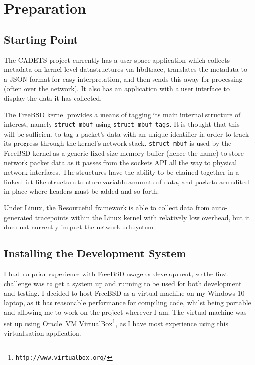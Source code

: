 \documentclass[a4paper,12pt,twoside,openright]{report}
\begin{document}
	
	
	\chapter{Preparation}
	
	\section{Starting Point}
	\label{sec:starting-point}
	
	The CADETS project currently has a user-space application which collects metadata on kernel-level	datastructures via libdtrace, translates the metadata to a JSON format for easy interpretation, and	then sends this away for processing (often over the network). It also has an application with a user interface to display the data it has collected.
	
	The FreeBSD kernel provides a means of tagging its main internal structure of interest, namely \verb|struct mbuf| using \verb|struct mbuf_tags|. It is thought that this will be sufficient to tag a packet’s data with an unique identifier in order to track its progress through the kernel’s network stack. \verb|struct mbuf| is used by the FreeBSD kernel as a generic fixed size memory buffer (hence the name) to store network packet data as it passes from the sockets API all the way to physical network interfaces. The structures have the ability to be chained together in a linked-list like structure to store variable amounts of data, and packets are edited in place where headers must be added and so forth.
	
	Under Linux, the Resourceful framework is able to collect data from auto-generated tracepoints	within the Linux kernel with relatively low overhead, but it does not currently inspect the network subsystem.
	
	\section{Installing the Development System}
	
	I had no prior experience with FreeBSD usage or development, so the first challenge was to get a system up and running to be used for both development and testing. I decided to host FreeBSD as a virtual machine on my Windows 10 laptop, as it has reasonable performance for compiling code, whilst being portable and allowing me to work on the project wherever I am. The virtual machine was set up using Oracle\texttrademark\ VM VirtualBox\footnote{\texttt{http://www.virtualbox.org/}}, as I have most experience using this virtualisation application.
	
\end{document}
